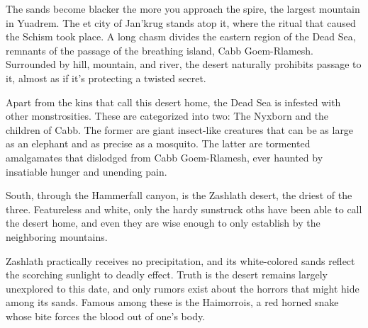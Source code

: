 The sands become blacker the more you approach the spire, the largest mountain in Yuadrem.
The et city of Jan'krug stands atop it, where the ritual that caused the Schism took place.
A long chasm divides the eastern region of the Dead Sea, remnants of the passage of the breathing island, Cabb Goem-Rlamesh.
Surrounded by hill, mountain, and river, the desert naturally prohibits passage to it, almost as if it's protecting a twisted secret.

Apart from the kins that call this desert home, the Dead Sea is infested with other monstrosities.
These are categorized into two: The Nyxborn and the children of Cabb.
The former are giant insect-like creatures that can be as large as an elephant and as precise as a mosquito.
The latter are tormented amalgamates that dislodged from Cabb Goem-Rlamesh, ever haunted by insatiable hunger and unending pain.


South, through the Hammerfall canyon, is the Zashlath desert, the driest of the three.
Featureless and white, only the hardy sunstruck oths have been able to call the desert home, and even they are wise enough to only establish by the neighboring mountains.

Zashlath practically receives no precipitation, and its white-colored sands reflect the scorching sunlight to deadly effect.
Truth is the desert remains largely unexplored to this date, and only rumors exist about the horrors that might hide among its sands.
Famous among these is the Haimorrois, a red horned snake whose bite forces the blood out of one's body.
